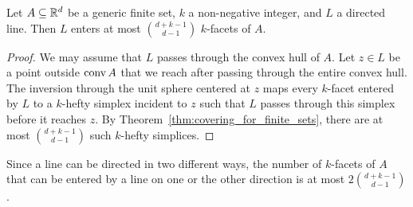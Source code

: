 \documentclass[a4paper,UKenglish,cleveref, autoref,numberwithinsect]{socg-lipics-v2021}
\newcommand {\mm}[1] {\ifmmode{#1}\else{\mbox{\(#1\)}}\fi}
\theoremstyle{plain}
\newcommand{\Rspace}        {\mm{{\mathbb R}}}
\newcommand{\conv}[1]       {\mm{{\rm conv\,}{#1}}}
\begin{document}
\begin{proposition}
  \label{prop:exact_Lovasz_lemma}
  Let $A \subseteq \Rspace^d$ be a generic finite set, $k$ a non-negative integer, and $L$ a directed line. 
  Then $L$ enters at most $\binom{d+k-1}{d-1}$ $k$-facets of $A$.
\end{proposition}
\begin{proof}
  We may assume that $L$ passes through the convex hull of $A$.
  Let $z \in L$ be a point outside $\conv{A}$ that we reach after passing through the entire convex hull.
  The inversion through the unit sphere centered at $z$ maps every $k$-facet entered by $L$ to a $k$-hefty simplex incident to $z$ such that $L$ passes through this simplex before it reaches $z$.
  By Theorem~\ref{thm:covering_for_finite_sets}, there are at most $\binom{d+k-1}{d-1}$ such $k$-hefty simplices.
\end{proof}
Since a line can be directed in two different ways, the number of $k$-facets of $A$ that can be entered by a line on one or the other direction is at most $2 \binom{d+k-1}{d-1}$.
\end{document}
